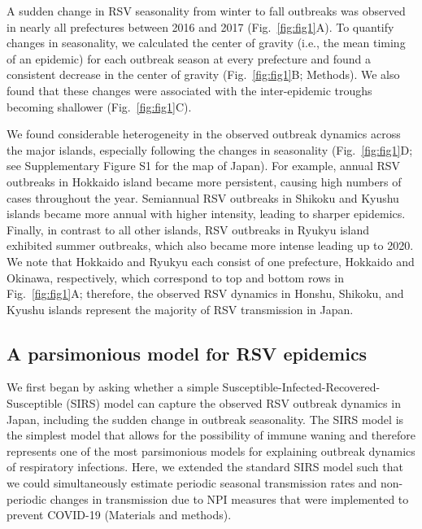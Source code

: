 \documentclass[12pt]{article}
\newcommand{\fref}[1]{Fig.~\ref{fig:#1}}
\begin{document}
A sudden change in RSV seasonality from winter to fall outbreaks was observed in nearly all prefectures between 2016 and 2017 (\fref{fig1}A).
To quantify changes in seasonality, we calculated the center of gravity (i.e., the mean timing of an epidemic) for each outbreak season at every prefecture and found a consistent decrease in the center of gravity (\fref{fig1}B; Methods). 
We also found that these changes were associated with the inter-epidemic troughs becoming shallower (\fref{fig1}C).

We found considerable heterogeneity in the observed outbreak dynamics across the major islands, especially following the changes in seasonality (\fref{fig1}D; see Supplementary Figure S1 for the map of Japan).
For example, annual RSV outbreaks in Hokkaido island became more persistent, causing high numbers of cases throughout the year.
Semiannual RSV outbreaks in Shikoku and Kyushu islands became more annual with higher intensity, leading to sharper epidemics.
Finally, in contrast to all other islands, RSV outbreaks in Ryukyu island exhibited summer outbreaks, which also became more intense leading up to 2020.
We note that Hokkaido and Ryukyu each consist of one prefecture, Hokkaido and Okinawa, respectively, 
which correspond to top and bottom rows in \fref{fig1}A;
therefore, the observed RSV dynamics in Honshu, Shikoku, and Kyushu islands represent the majority of RSV transmission in Japan.

\subsection*{A parsimonious model for RSV epidemics}

We first began by asking whether a simple Susceptible-Infected-Recovered-Susceptible (SIRS) model can capture the observed RSV outbreak dynamics in Japan, including the sudden change in outbreak seasonality.
The SIRS model is the simplest model that allows for the possibility of immune waning and therefore represents one of the most parsimonious models for explaining outbreak dynamics of respiratory infections.
Here, we extended the standard SIRS model such that we could simultaneously estimate periodic seasonal transmission rates and non-periodic changes in transmission due to NPI measures that were implemented to prevent COVID-19 (Materials and methods).
\end{document}
